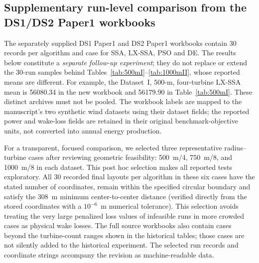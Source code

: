 \subsection{Supplementary run-level comparison from the DS1/DS2 Paper1 workbooks}
\label{sec:additional-runlevel}
The separately supplied DS1 Paper1 and DS2 Paper1 workbooks contain 30 records per algorithm and case for SSA, LX-SSA, PSO and DE. The results below constitute a \emph{separate follow-up experiment}; they do not replace or extend the 30-run samples behind Tables~\ref{tab:500mI}--\ref{tab:1000mII}, whose reported means are different. For example, the Dataset~I, 500-m, four-turbine LX-SSA mean is 56080.34 in the new workbook and 56179.90 in Table~\ref{tab:500mI}. These distinct archives must not be pooled. The workbook labels are mapped to the manuscript's two synthetic wind datasets using their dataset fields; the reported power and wake-loss fields are retained in their original benchmark-objective units, not converted into annual energy production.

For a transparent, focused comparison, we selected three representative radius--turbine cases after reviewing geometric feasibility: 500~m/4, 750~m/8, and 1000~m/8 in each dataset. This post hoc selection makes all reported tests exploratory. All 30 recorded final layouts per algorithm in these six cases have the stated number of coordinates, remain within the specified circular boundary and satisfy the 308~m minimum center-to-center distance (verified directly from the stored coordinates with a $10^{-6}$~m numerical tolerance). This selection avoids treating the very large penalized loss values of infeasible runs in more crowded cases as physical wake losses. The full source workbooks also contain cases beyond the turbine-count ranges shown in the historical tables; those cases are not silently added to the historical experiment. The selected run records and coordinate strings accompany the revision as machine-readable data.

